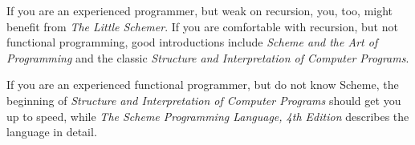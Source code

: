 If you are an experienced programmer, but weak on recursion, you, too, might
benefit from \emph{The Little Schemer}.  If you are comfortable with
recursion, but not functional programming, good introductions include
\emph{Scheme and the Art of Programming}\cite{Springer:1989:Art}
and the classic \emph{Structure and Interpretation of Computer
  Programs}\cite{Abelson:1996:SIC:547755}.


If you are an experienced functional programmer, but do not know
 Scheme, the beginning of \emph{Structure and Interpretation
  of Computer Programs} should get you up to speed, while \emph{The Scheme Programming Language, 4th
  Edition}\cite{Dybvig:2009:SPL:1618542} describes the language in detail.







